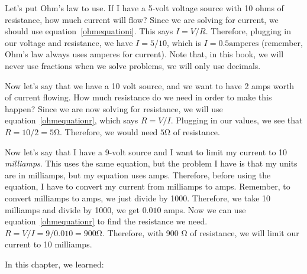 \begin{exampleprob}
Let's put Ohm's law to use.
If I have a 5-volt voltage source with 10 ohms of resistance, how much current will flow?
Since we are solving for current, we should use equation~\ref{ohmequationi}.
This says $I = V / R$.
Therefore, plugging in our voltage and resistance, we have $I = 5 / 10$, which is $I = 0.5 \textrm{amperes}$ (remember, Ohm's law always uses amperes for current).
Note that, in this book, we will never use fractions when we solve problems, we will only use decimals.
\end{exampleprob}

\begin{exampleprob}
Now let's say that we have a 10 volt source, and we want to have 2 amps worth of current flowing.
How much resistance do we need in order to make this happen?
Since we are now solving for resistance, we will use equation~\ref{ohmequationr}, which says $R = V / I$.
Plugging in our values, we see that $R = 10 / 2 = 5 \si{\ohm}$.
Therefore, we would need $5 \si{\ohm}$ of resistance.
\end{exampleprob}

\begin{exampleprob}
Now let's say that I have a 9-volt source and I want to limit my current to 10 \emph{milliamps}.  
This uses the same equation, but the problem I have is that my units are in milliamps, but my equation uses amps.
Therefore, before using the equation, I have to convert my current from milliamps to amps. 
Remember, to convert milliamps to amps, we just divide by 1000.
Therefore, we take 10 milliamps and divide by 1000, we get $0.010$ amps.
Now we can use equation~\ref{ohmequationr} to find the resistance we need.
$R = V / I = 9 / 0.010 = 900 \si{\ohm}$.
Therefore, with 900 \si{\ohm} of resistance, we will limit our current to 10 milliamps.
\end{exampleprob}

\reviewsection

In this chapter, we learned:

